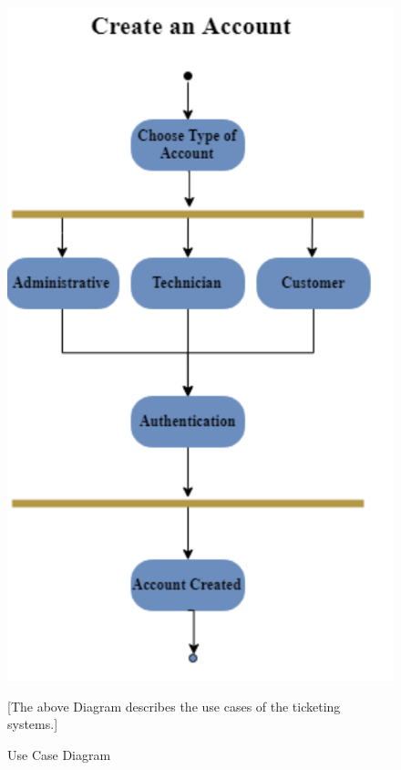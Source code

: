 \documentclass[letterpaper]{article}
\begin{document}
\begin{figure}[htbp]
  \includegraphics[]{AD_CreateAcc}
  \caption{Use Case Diagram}[The above Diagram describes the use cases of the ticketing systems.]
  \centering
\end{figure}
\end{document}
